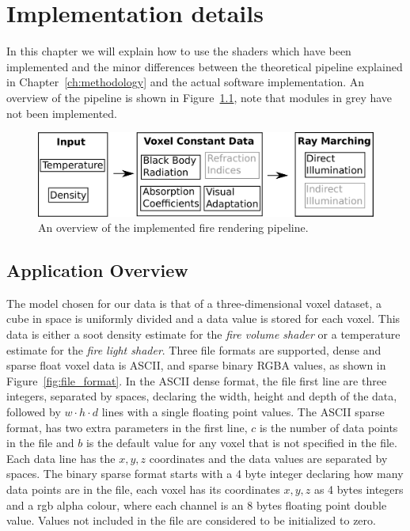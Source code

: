 \chapter{Implementation details}
\label{ch:implementation_details}

In this chapter we will explain how to use the shaders which have been implemented and the minor differences between the theoretical pipeline explained in Chapter~\ref{ch:methodology} and the actual software implementation.
An overview of the pipeline is shown in Figure~\ref{fig:pipeline_simplified}, note that modules in grey have not been implemented.

\begin{figure}[htbp!]
	\centering
	\includegraphics[width=\textwidth]{img/pipeline_simplified}
	\caption{An overview of the implemented fire rendering pipeline.}
	\label{fig:pipeline_simplified}
\end{figure}

\section{Application Overview}
\label{sec:application_overview}

The model chosen for our data is that of a three-dimensional voxel dataset, a cube in space is uniformly divided and a data value is stored for each voxel.
This data is either a soot density estimate for the \textit{fire volume shader} or a temperature estimate for the \textit{fire light shader}.
Three file formats are supported, dense and sparse float voxel data is ASCII, and sparse binary RGBA values, as shown in Figure~\ref{fig:file_format}.
In the ASCII dense format, the file first line are three integers, separated by spaces, declaring the width, height and depth of the data, followed by $w \cdot h \cdot d$ lines with a single floating point values.
The ASCII sparse format, has two extra parameters in the first line, $c$ is the number of data points in the file and $b$ is the default value for any voxel that is not specified in the file.
Each data line has the $x,y,z$ coordinates and the data values are separated by spaces.
The binary sparse format starts with a 4 byte integer declaring how many data points are in the file, each voxel has its coordinates $x,y,z$ as 4 bytes integers and a rgb alpha colour, where each channel is an 8 bytes floating point double value.
Values not included in the file are considered to be initialized to zero. 

